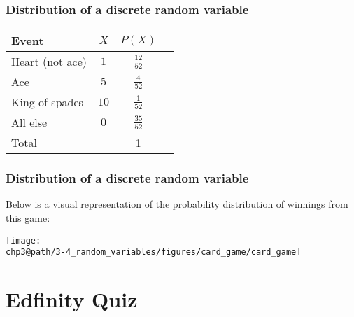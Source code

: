 \documentclass[slidestop,compress,mathserif]{beamer}
\makeatletter
\def\chp3@path{../../Chp 3}
\makeatother
\begin{document}

\begin{frame}
\frametitle{Distribution of a discrete random variable}


\pause

\begin{center}
\renewcommand{\arraystretch}{1.5}
\begin{tabular}{l | c | c | c }
Event		& $X$ 		& $P(X)$        		 \\
\hline
Heart (not ace)	& $1$		& $\frac{12}{52}$	 \\
Ace			& $5$		& $\frac{4}{52}$	 \\	
King of spades	& $10$		& $\frac{1}{52}$	 \\	
All else		& $0$		& $\frac{35}{52}$	\\
\hline
Total			&			&		1		
\end{tabular}

\end{center}

\end{frame}


\begin{frame}
\frametitle{Distribution of a discrete random variable}

Below is a visual representation of the probability distribution of winnings from this game:

\begin{center}
\texttt{[image: \\chp3@path/3-4\_random\_variables/figures/card\_game/card\_game]}
\end{center}

\end{frame}



\section{Edfinity Quiz}

\end{document}
